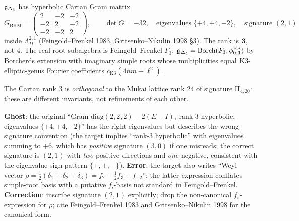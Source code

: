 \begin{theorem}\ClaimStatusHealed
\label{wn:thm:healed-cartan-mukai}
$\mathfrak{g}_{\Delta_5}$ has hyperbolic Cartan Gram matrix
\[
G_{\mathrm{BKM}} = \begin{pmatrix} 2 & -2 & -2 \\ -2 & 2 & -2 \\ -2 & -2 & 2 \end{pmatrix}, \qquad \det G = -32,
\quad \text{eigenvalues } \{+4, +4, -2\}, \quad \text{signature } (2, 1)
\]
inside $\Lambda^{2, 1}_{II}$ (Feingold--Frenkel 1983, Gritsenko--Nikulin 1998 \S3). The rank is $\mathbf{3}$, not $4$. The real-root subalgebra is Feingold--Frenkel $F_3$; $\mathfrak{g}_{\Delta_5} = \mathrm{Borch}(F_3, \phi_{0, 1}^{\mathrm{K3}})$ by Borcherds extension with imaginary simple roots whose multiplicities equal K3-elliptic-genus Fourier coefficients $c_{\mathrm{K3}}(4nm - \ell^2)$.

The Cartan rank $3$ is \emph{orthogonal} to the Mukai lattice rank $24$ of signature $\mathrm{II}_{4, 20}$: these are different invariants, not refinements of each other.
\end{theorem}

\textbf{Ghost}: the original ``Gram $\mathrm{diag}(2, 2, 2) - 2(E - I)$, rank-3 hyperbolic, eigenvalues $\{+4, +4, -2\}$'' has the right eigenvalues but describes the wrong signature convention (the target implies ``rank-3 hyperbolic'' with eigenvalues summing to $+6$, which has \emph{positive} signature $(3, 0)$ if one misreads; the correct signature is $(2, 1)$ with \emph{two} positive directions and \emph{one} negative, consistent with the eigenvalue sign pattern $\{+, +, -\}$). \textbf{Error}: the target also writes ``Weyl vector $\rho = \tfrac{1}{2}(\delta_1 + \delta_2 + \delta_3) = f_2 - \tfrac{1}{2}f_3 + f_{-2}$''; the latter expression conflates simple-root basis with a putative $f_i$-basis not standard in Feingold--Frenkel. \textbf{Correction}: inscribe signature $(2, 1)$ explicitly; drop the non-canonical $f_i$-expression for $\rho$; cite Feingold--Frenkel 1983 and Gritsenko--Nikulin 1998 for the canonical form.

